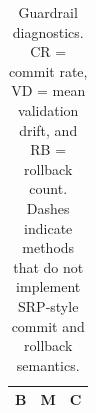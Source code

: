 \begin{table}[t]
\centering
\setlength{\tabcolsep}{3pt}
\scriptsize
\begin{tabular}{llr}
\toprule
B & M & C \\
\midrule
\bottomrule
\end{tabular}
\caption{Guardrail diagnostics. CR = commit rate, VD = mean validation drift, and RB = rollback count. Dashes indicate methods that do not implement SRP-style commit and rollback semantics.}
\label{tab:srp-guardrail-table}
\end{table}
